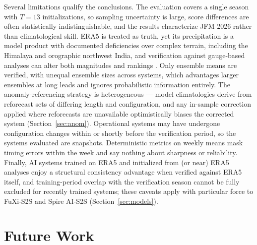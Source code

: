 \documentclass[11pt]{article}
\begin{document}
Several limitations qualify the conclusions. The evaluation covers a
single season with $T=13$ initializations, so sampling uncertainty is
large, score differences are often statistically indistinguishable,
and the results characterize JFM 2026 rather than climatological
skill. ERA5 is treated as truth, yet its precipitation is a model
product with documented deficiencies over complex terrain, including
the Himalaya and orographic northwest India, and verification against
gauge-based analyses can alter both magnitudes and rankings
\citep{hersbach2020,pai2014}. Only ensemble means are verified, with
unequal ensemble sizes across systems, which advantages larger
ensembles at long leads and ignores probabilistic information
entirely. The anomaly-referencing strategy is heterogeneous --- model
climatologies derive from reforecast sets of differing length and
configuration, and any in-sample correction applied where reforecasts
are unavailable optimistically biases the corrected system
(Section~\ref{sec:anom}). Operational systems may have undergone
configuration changes within or shortly before the verification
period, so the systems evaluated are snapshots. Deterministic metrics
on weekly means mask timing errors within the week and say nothing
about sharpness or reliability. Finally, AI systems trained on ERA5
and initialized from (or near) ERA5 analyses enjoy a structural
consistency advantage when verified against ERA5 itself, and
training-period overlap with the verification season cannot be fully
excluded for recently trained systems; these caveats apply with
particular force to FuXi-S2S and Spire AI-S2S
(Section~\ref{sec:models}).

\section{Future Work}\label{sec:future}
\end{document}
